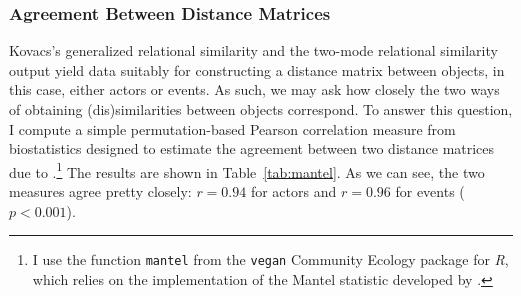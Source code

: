 \documentclass[a4paper,fleqn]{cas-sc}
\begin{document}
\subsubsection{Agreement Between Distance Matrices}
Kovacs's generalized relational similarity and the two-mode relational similarity output yield data suitably for constructing a distance matrix between objects, in this case, either actors or events. As such, we may ask how closely the two ways of obtaining (dis)similarities between objects correspond. To answer this question, I compute a simple permutation-based Pearson correlation measure from biostatistics designed to estimate the agreement between two distance matrices due to \citet{mantel1967detection}.\footnote{I use the function \texttt{mantel} from the \texttt{vegan} Community Ecology package \citep{vegan} for \textit{R}, which relies on the implementation of the Mantel statistic developed by \citet{legendre2012numerical}.} The results are shown in Table~\ref{tab:mantel}. As we can see, the two measures agree pretty closely: $r = 0.94$ for actors and $r = 0.96$ for events ($p < 0.001$). 
\end{document}
